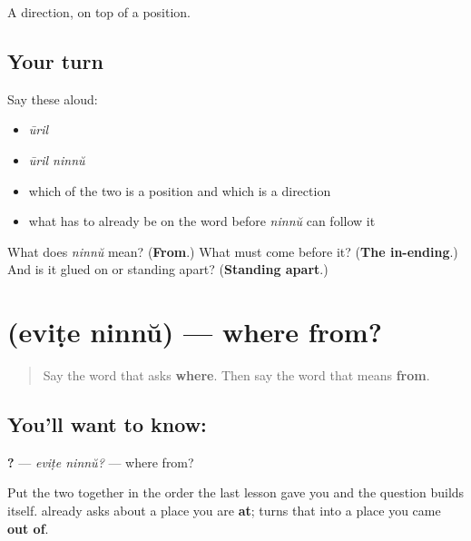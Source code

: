 \begin{grammarlens}[title={What you've built}]
A direction, on top of a position.
\end{grammarlens}

\subsection*{Your turn}
Say these aloud:

\begin{itemize}
\raggedright
  \item \emph{ūril}
  \item \emph{ūril ninnŭ}
  \item which of the two is a position and which is a direction
  \item what has to already be on the word before \emph{ninnŭ} can follow it
\end{itemize}

\begin{tcolorbox}[breakable,colback=teal!4,colframe=teal!35!black,title={Before you move on}]
What does \emph{ninnŭ} mean? (\textbf{From}.) What must come before it? (\textbf{The in-ending}.) And is it glued on or standing apart? (\textbf{Standing apart}.)
\end{tcolorbox}
\section[\texorpdfstring{\ml{എവിടെ} \ml{നിന്ന്} (eviṭe ninnŭ)}{എവിടെ നിന്ന് (eviṭe ninnŭ)}]{  (eviṭe ninnŭ) — where from?}

\label{lesson:ML-C83-evide-ninnu}



\begin{quote}
Say the word that asks \textbf{where}. Then say the word that means \textbf{from}.
\end{quote}

\subsection*{You'll want to know:  }
\textbf{ ?} — \emph{eviṭe ninnŭ?} — where from?

Put the two together in the order the last lesson gave you and the question builds itself. \textbf{} already asks about a place you are \textbf{at}; \textbf{} turns that into a place you came \textbf{out of}.

